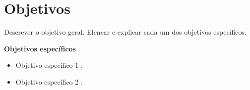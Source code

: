 \section{Objetivos}
\label{sec:objetivos}

Descrever o objetivo geral. Elencar e explicar cada um dos objetivos específicos.

\textbf{Objetivos específicos}

\begin{itemize}
    \item Objetivo específico 1 : 
    \item Objetivo específico 2 : 
\end{itemize}
